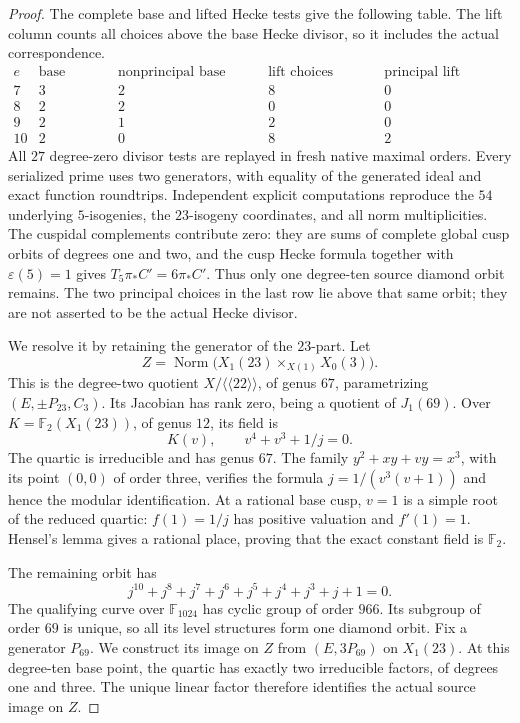 \begin{proof}
The complete base and lifted Hecke tests give the following table.
The lift column counts all choices above the base Hecke divisor,
so it includes the actual correspondence.
\[
\begin{array}{c|r|r|r|r}
 e&\text{base points}&\text{nonprincipal base tests}
 &\text{lift choices tested}&\text{principal lift choices}\\\hline
 7&3&2&8&0\\
 8&2&2&0&0\\
 9&2&1&2&0\\
 10&2&0&8&2
\end{array}
\]
All $27$ degree-zero divisor tests are replayed in fresh native
maximal orders. Every serialized prime uses two generators,
with equality of the generated ideal and exact function
roundtrips. Independent explicit computations reproduce the
$54$ underlying $5$-isogenies, the $23$-isogeny coordinates, and
all norm multiplicities.
The cuspidal complements contribute zero: they are sums of
complete global cusp orbits of degrees one and two, and the
cusp Hecke formula together with $\varepsilon(5)=1$ gives
$T_5\pi_*C'=6\pi_*C'$.
Thus only one degree-ten source diamond orbit remains.
The two principal choices in the last row lie above that same
orbit; they are not asserted to be the actual Hecke divisor.

We resolve it by retaining the generator of the $23$-part.
Let
\[
 Z=\operatorname{Norm}\bigl(X_1(23)\times_{X(1)}X_0(3)\bigr).
\]
This is the degree-two quotient $X/\langle\langle22\rangle\rangle$,
of genus $67$, parametrizing $(E,\pm P_{23},C_3)$.
Its Jacobian has rank zero, being a quotient of $J_1(69)$.
Over $K=\mathbb F_2(X_1(23))$, of genus $12$, its field is
\[
 K(v),\qquad v^4+v^3+1/j=0.
\]
The quartic is irreducible and has genus $67$. The family
$y^2+xy+vy=x^3$, with its point $(0,0)$ of order three, verifies
the formula $j=1/(v^3(v+1))$ and hence the modular identification.
At a rational base cusp, $v=1$ is a simple root of the reduced
quartic: $f(1)=1/j$ has positive valuation and $f'(1)=1$.
Hensel's lemma gives a rational place, proving that the exact
constant field is $\mathbb F_2$.

The remaining orbit has
\[
 j^{10}+j^8+j^7+j^6+j^5+j^4+j^3+j+1=0.
\]
The qualifying curve over $\mathbb F_{1024}$ has cyclic group of
order $966$. Its subgroup of order $69$ is unique, so all its
level structures form one diamond orbit. Fix a generator $P_{69}$.
We construct its image on $Z$ from $(E,3P_{69})$ on $X_1(23)$.
At this degree-ten base point, the quartic has exactly two
irreducible factors, of degrees one and three. The unique linear
factor therefore identifies the actual source image on $Z$.


\end{proof}
